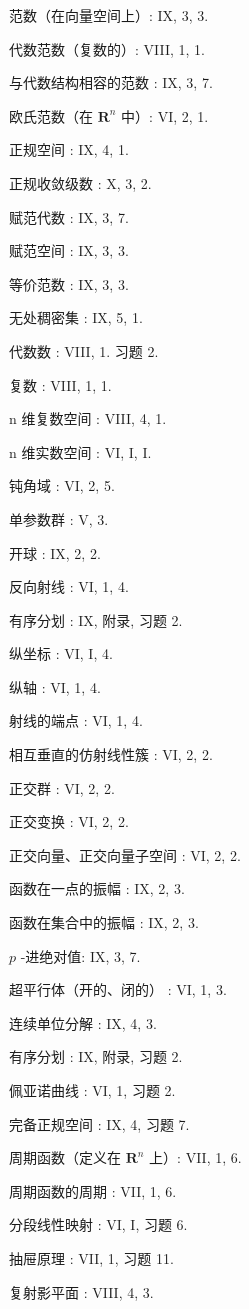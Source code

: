 范数（在向量空间上）: IX, 3, 3.

代数范数（复数的）: VIII, 1, 1.

与代数结构相容的范数 : IX, 3, 7.

欧氏范数（在 \(\mathbf{R}^n\) 中）: VI, 2, 1.

正规空间 : IX, 4, 1.

正规收敛级数 : X, 3, 2.

赋范代数 : IX, 3, 7.

赋范空间 : IX, 3, 3.

等价范数 : IX, 3, 3.

无处稠密集 : IX, 5, 1.

代数数 : VIII, 1. 习题 2.

复数 : VIII, 1, 1.

n 维复数空间 : VIII, 4, 1.

n 维实数空间 : VI, I, I.

钝角域 : VI, 2, 5.

单参数群 : V, 3.

开球 : IX, 2, 2.

反向射线 : VI, 1, 4.

有序分划 : IX, 附录, 习题 2.

纵坐标 : VI, I, 4.

纵轴 : VI, 1, 4.

射线的端点 : VI, 1, 4.

相互垂直的仿射线性簇 : VI, 2, 2.

正交群 : VI, 2, 2.

正交变换 : VI, 2, 2.

正交向量、正交向量子空间 : VI, 2, 2.

函数在一点的振幅 : IX, 2, 3.

函数在集合中的振幅 : IX, 2, 3.

\(p\) -进绝对值: IX, 3, 7.

超平行体（开的、闭的） : VI, 1, 3.

连续单位分解 : IX, 4, 3.

有序分划 : IX, 附录, 习题 2.

佩亚诺曲线 : VI, 1, 习题 2.

完备正规空间 : IX, 4, 习题 7.

周期函数（定义在 \(\mathbf{R}^n\) 上）: VII, 1, 6.

周期函数的周期 : VII, 1, 6.

分段线性映射 : VI, I, 习题 6.

抽屉原理 : VII, 1, 习题 11.

复射影平面 : VIII, 4, 3.

